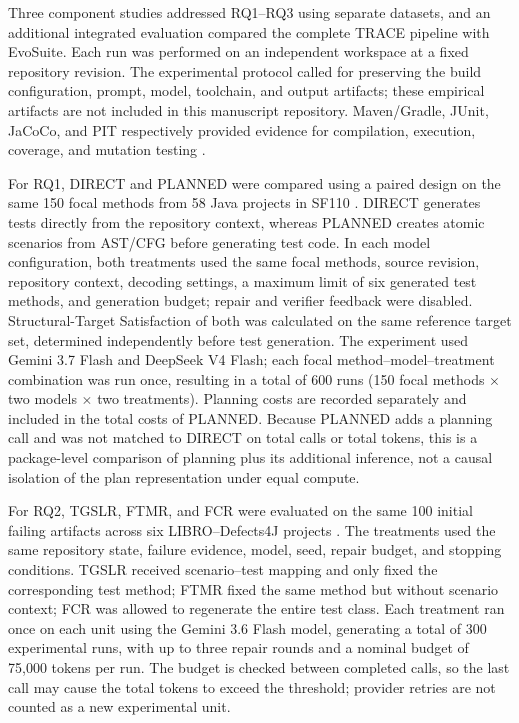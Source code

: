 \documentclass[pdflatex,sn-basic,Numbered,iicol]{sn-jnl}
\begin{document}
Three component studies addressed RQ1--RQ3 using separate datasets, and an additional integrated evaluation compared the complete TRACE pipeline with EvoSuite. Each run was performed on an independent workspace at a fixed repository revision. The experimental protocol called for preserving the build configuration, prompt, model, toolchain, and output artifacts; these empirical artifacts are not included in this manuscript repository. Maven/Gradle, JUnit, JaCoCo, and PIT respectively provided evidence for compilation, execution, coverage, and mutation testing \cite{bib35,bib33,bib34}.

For RQ1, DIRECT and PLANNED were compared using a paired design on the same 150 focal methods from 58 Java projects in SF110 \cite{bib37}. DIRECT generates tests directly from the repository context, whereas PLANNED creates atomic scenarios from AST/CFG before generating test code. In each model configuration, both treatments used the same focal methods, source revision, repository context, decoding settings, a maximum limit of six generated test methods, and generation budget; repair and verifier feedback were disabled. Structural-Target Satisfaction of both was calculated on the same reference target set, determined independently before test generation. The experiment used Gemini 3.7 Flash and DeepSeek V4 Flash; each focal method--model--treatment combination was run once, resulting in a total of 600 runs (150 focal methods \ensuremath{\times} two models \ensuremath{\times} two treatments). Planning costs are recorded separately and included in the total costs of PLANNED. Because PLANNED adds a planning call and was not matched to DIRECT on total calls or total tokens, this is a package-level comparison of planning plus its additional inference, not a causal isolation of the plan representation under equal compute.

For RQ2, TGSLR, FTMR, and FCR were evaluated on the same 100 initial failing artifacts across six LIBRO--Defects4J projects \cite{bib38,bib36}. The treatments used the same repository state, failure evidence, model, seed, repair budget, and stopping conditions. TGSLR received scenario--test mapping and only fixed the corresponding test method; FTMR fixed the same method but without scenario context; FCR was allowed to regenerate the entire test class. Each treatment ran once on each unit using the Gemini 3.6 Flash model, generating a total of 300 experimental runs, with up to three repair rounds and a nominal budget of 75,000 tokens per run. The budget is checked between completed calls, so the last call may cause the total tokens to exceed the threshold; provider retries are not counted as a new experimental unit.
\end{document}
